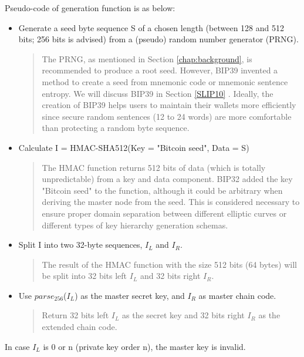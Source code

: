 Pseudo-code of generation function is as below:

\begin{itemize}
    \item Generate a seed byte sequence S of a chosen length (between 128 and 512 bits; 256 bits is advised) from a (pseudo) random number generator (PRNG).

          \begin{quote}
              The PRNG, as mentioned in Section \ref{chap:background}, is recommended to produce a root seed. However, BIP39 \cite{github/bip0039} invented a method to create a seed from mnemonic code or mnemonic sentence entropy. We will discuss BIP39 in Section \ref{SLIP10} . Ideally, the creation of BIP39 helps users to maintain their wallets more efficiently since secure random sentences (12 to 24 words) are more comfortable than protecting a random byte sequence.
          \end{quote}

    \item Calculate I = HMAC-SHA512(Key = "Bitcoin seed", Data = S)


          \begin{quote}
              The HMAC function returns 512 bits of data (which is totally unpredictable) from a key and data component. BIP32 added the key "Bitcoin seed" to the function, although it could be arbitrary when deriving the master node from the seed. This is considered necessary to ensure proper domain separation between different elliptic curves or different types of key hierarchy generation schemas.
          \end{quote}

    \item Split I into two 32-byte sequences, $I_L$ and $I_R$.

          \begin{quote}
              The result of the HMAC function with the size 512 bits (64 bytes) will be split into 32 bits left  $I_L$ and 32 bits right $I_R$.
          \end{quote}
    \item Use $parse_{256}$($I_L$) as the master secret key, and $I_R$ as master chain code.

          \begin{quote}
              Return 32 bits left $I_L$ as the secret key and 32 bits right $I_R$ as the extended chain code.
          \end{quote}

\end{itemize}
In case $I_L$ is 0 or  n (private key  order n), the master key is invalid.

